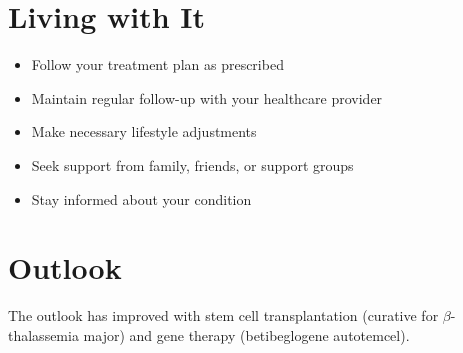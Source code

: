 \section{Living with It}
\begin{itemize}[noitemsep]
  \item Follow your treatment plan as prescribed
  \item Maintain regular follow-up with your healthcare provider
  \item Make necessary lifestyle adjustments
  \item Seek support from family, friends, or support groups
  \item Stay informed about your condition
\end{itemize}
\section{Outlook}
The outlook has improved with stem cell transplantation (curative for $\beta$-thalassemia major) and gene therapy (betibeglogene autotemcel).
